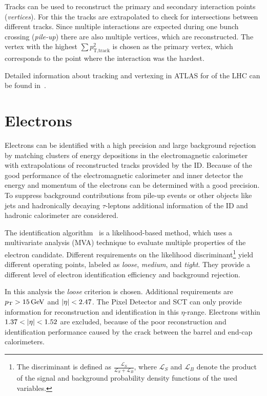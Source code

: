 Tracks can be used to reconstruct the primary and secondary interaction points (\emph{vertices}).
For this the tracks are extrapolated to check for intersections between different tracks.
Since multiple interactions are expected during one bunch crossing (\emph{pile-up}) there are also multiple vertices, which
are reconstructed.
The vertex with the highest $\sum p_{\text{T},\text{track}}^2$ is chosen as the primary vertex, which corresponds to the
point where the interaction was the hardest.

Detailed information about tracking and vertexing in ATLAS for \runtwo{} of the LHC
can be found in~\cite{ATL-PHYS-PUB-2015-051,ATL-PHYS-PUB-2015-006,ATL-PHYS-PUB-2015-026}.


\section{Electrons}\label{sec:object_selection:electrons}

Electrons can be identified with a high precision and large background rejection by matching clusters of energy
depositions in the electromagnetic calorimeter with extrapolations of reconstructed tracks provided by the ID\@.
Because of the good performance of the electromagnetic calorimeter and inner detector the energy and momentum  of the electrons can
be determined with a good precision.
To suppress background contributions from pile-up events or other objects like jets and hadronically decaying $\tau$-leptons
additional information of the ID and hadronic calorimeter are considered.

The identification algorithm~\cite{ATLAS-CONF-2016-024} is a likelihood-based method, which uses a multivariate analysis (MVA) technique to
evaluate multiple properties of the electron candidate.
Different requirements on the likelihood discriminant\footnote{The discriminant is defined as
$\frac{\mathcal{L}_S}{\mathcal{L}_S + \mathcal{L}_B}$, where $\mathcal{L}_S$ and $\mathcal{L}_B$ denote the product of
the signal and background probability density functions of the used variables.} yield different operating points,
labeled as  \emph{loose}, \emph{medium}, and \emph{tight}.
They provide a different level of electron identification efficiency and background rejection.

In this analysis the \emph{loose} criterion is chosen.
Additional requirements are $\pt > \unit[15]{GeV}$ and $\left|\eta\right| < 2.47$.
The Pixel Detector and SCT can only provide information for reconstruction and identification in this $\eta$-range.
Electrons within $1.37 < \left|\eta\right| < 1.52$ are excluded, because of the poor reconstruction and identification
performance caused by the crack between the barrel and end-cap calorimeters.

